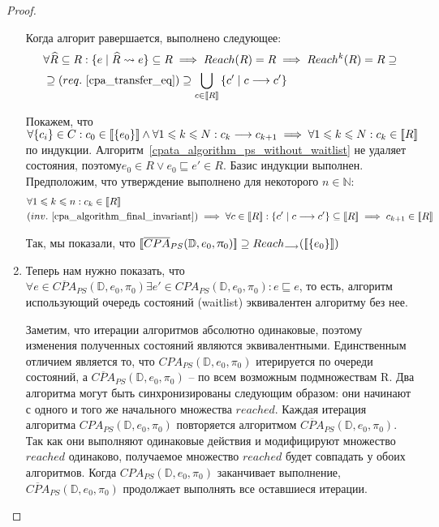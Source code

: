\begin{proof}
\begin{enumerate}
\begin{enumerate}
\end{enumerate}

Когда алгорит равершается, выполнено следующее:
\begin{equation}
\label{cpa_algorithm_final_invariant}
\begin{aligned}
& \forall \widehat{R} \subseteq R: \{e \mid \widehat{R} \leadsto e\} \subseteq R \implies Reach(R) = R \implies Reach^k(R) = R \supseteq \\
& \supseteq (req.~\ref{cpa_transfer_eq}) \supseteq \bigcup_{c \in [\![ R ]\!]}{\{c' \mid c \longrightarrow c'\}}
\end{aligned}
\end{equation}

Покажем, что $\forall \{c_i\} \in C: c_0 \in [\![ \{e_0\} ]\!] \land \forall 1 \leqslant k \leqslant N: c_{k} \longrightarrow c_{k+1} \implies \forall 1 \leqslant k \leqslant N: c_k \in [\![ R ]\!]$ по индукции.
Алгоритм~\ref{cpata_algorithm_ps_without_waitlist} не удаляет состояния, поэтому$e_0 \in R \lor e_0 \sqsubseteq e' \in R$. Базис индукции выполнен.
Предположим, что утверждение выполнено для некоторого $n \in \mathbb{N}$:
\begin{align}
& \forall 1 \leq k \leq n: c_k \in \conc{R} \nonumber \\ 
& (inv.~\ref{cpa_algorithm_final_invariant}) \implies \forall c \in \conc{R}: \{c' \mid c \tcarrow c'\} \subseteq \conc{R} \implies c_{k+1} \in \conc{R} \nonumber
\end{align}

Так, мы показали, что $[\![ \overline{CPA}_{PS}(\mathbb{D}, e_0, \uppi_0) ]\!] \supseteq Reach_{\longrightarrow}([\![ \{e_0\} ]\!])$

\item Теперь нам нужно показать, что $\forall e \in \overline{CPA}_{PS}(\mathbb{D}, e_0, \pi_0) \exists e' \in CPA_{PS}(\mathbb{D}, e_0, \pi_0): e \sqsubseteq e$, то есть, алгоритм использующий очередь состояний (waitlist) эквивалентен алгоритму без нее.

Заметим, что итерации алгоритмов абсолютно одинаковые, поэтому изменения полученных состояний являются эквивалентными.
Единственным отличием является то, что $CPA_{PS}(\mathbb{D}, e_0, \pi_0)$ итерируется по очереди состояний, а $\overline{CPA}_{PS}(\mathbb{D}, e_0, \pi_0)$ -- по всем возможным подмножествам R.
Два алгоритма могут быть синхронизированы следующим образом: они начинают с одного и того же начального множества $reached$. 
Каждая итерация алгоритма $CPA_{PS}(\mathbb{D}, e_0, \pi_0)$ повторяется алгоритмом $\overline{CPA}_{PS}(\mathbb{D}, e_0, \pi_0)$. 
Так как они выполняют одинаковые действия и модифицируют множество $reached$ одинаково, получаемое множество $reached$ будет совпадать у обоих алгоритмов.
Когда $CPA_{PS}(\mathbb{D}, e_0, \pi_0)$ заканчивает выполнение, $\overline{CPA}_{PS}(\mathbb{D}, e_0, \pi_0)$ продолжает выполнять все оставшиеся итерации.


\end{enumerate}
\end{proof}
